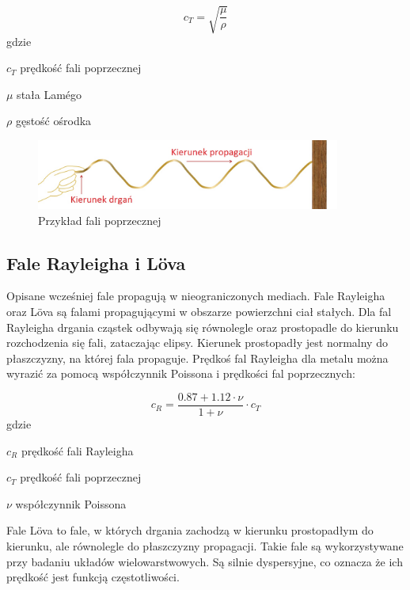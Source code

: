 \begin{equation}
c_T=\sqrt{\frac{\mu}{\rho}}
\end{equation}
gdzie
\begin{eqwhere}[2cm]
        \item[$c_T$] prędkość fali poprzecznej
        \item[$\mu$] stała Lam\'{e}go
        \item[$\rho$] gęstość ośrodka
\end{eqwhere}

\begin{figure}[h]
\centering
\includegraphics[width=10cm]{Zdjecia/2/fala_poprzeczna}
\caption{Przykład fali poprzecznej}
\label{fig:fala_poprzeczna}
\end{figure}

\subsection{Fale Rayleigha i L\"{o}va}

Opisane wcześniej fale propagują w nieograniczonych mediach. Fale Rayleigha oraz L\"{o}va są falami propagującymi w obszarze powierzchni ciał stałych. Dla fal Rayleigha drgania cząstek odbywają się równolegle oraz prostopadle do kierunku rozchodzenia się fali, zataczając elipsy. Kierunek prostopadły jest normalny do płaszczyzny, na której fala propaguje. Prędkoś fal Rayleigha dla metalu można wyrazić za pomocą współczynnik Poissona i prędkości fal poprzecznych:

\begin{equation}
c_R=\frac{0.87+1.12\cdot\nu}{1+\nu}\cdot c_T
\end{equation}
gdzie
\begin{eqwhere}[2cm]
        \item[$c_R$] prędkość fali Rayleigha
        \item[$c_T$] prędkość fali poprzecznej
        \item[$\nu$] współczynnik Poissona
\end{eqwhere}

Fale L\"{o}va to fale, w których drgania zachodzą w kierunku prostopadłym do kierunku, ale równolegle do płaszczyzny propagacji. Takie fale są wykorzystywane przy badaniu układów wielowarstwowych. Są silnie dyspersyjne, co oznacza że ich prędkość jest funkcją częstotliwości.

